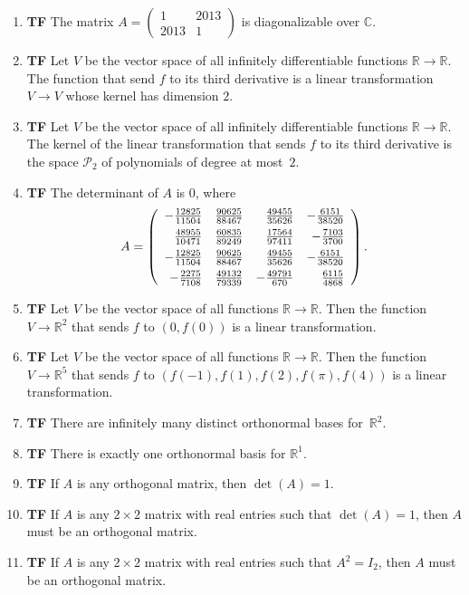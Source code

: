 \documentclass[12pt]{article}
\newcommand{\tf}[1]{\item {\bf {\color{blue}\hspace{1em}T\hspace{1em}F}}\hspace{1em} #1\vspace{1.1ex}}
\newcommand{\R}{\mathbb{R}}
\newcommand{\C}{\mathbb{C}}
\begin{document}
\begin{enumerate}
\tf{The matrix $A=\left(\begin{array}{rr}
1 & 2013 \\
2013 & 1
\end{array}\right)$ is diagonalizable over $\C$.}

\tf{Let $V$ be the vector space of all infinitely differentiable functions $\R\to \R$.
The function that send $f$ to its third derivative is a linear transformation $V\to V$ whose
kernel has dimension $2$.}

\tf{Let $V$ be the vector space of all infinitely differentiable functions $\R\to \R$.
The kernel of the linear transformation that sends $f$ to its third derivative is
the space $\mathcal{P}_{2}$ of polynomials of degree at most~$2$.}

\tf{The determinant of $A$ is $0$, where $$A=\left(\begin{array}{rrrr}
-\frac{12825}{11504} & \frac{90625}{88467} & \frac{49455}{35626} & -\frac{6151}{38520}\vspace{1ex}\\
\frac{48955}{10471} & \frac{60835}{89249} & \frac{17564}{97411} & -\frac{7103}{3700} \vspace{1ex}\\
-\frac{12825}{11504} & \frac{90625}{88467} & \frac{49455}{35626} & -\frac{6151}{38520}\vspace{1ex}\\
-\frac{2275}{7108} & \frac{49132}{79339} & -\frac{49791}{670} & \frac{6115}{4868}
\end{array}\right).$$}

\tf{Let $V$ be the vector space of all functions $\R\to\R$.  Then the function $V\to \R^2$ that sends $f$ to $(0, f(0))$
is a linear transformation.}

\tf{Let $V$ be the vector space of all functions $\R\to\R$.  Then the function $V\to \R^5$ that sends $f$ to $(f(-1),f(1),f(2),f(\pi),f(4))$
is a linear transformation.}

\tf{There are infinitely many distinct orthonormal bases for~$\R^2$.}

\tf{There is exactly one orthonormal basis for $\R^1$.}

\tf{If $A$ is any orthogonal matrix, then $\det(A)=1$.}

\tf{If $A$ is any $2\times 2$ matrix with real entries such that $\det(A)=1$, then $A$ must be an orthogonal matrix.}

\tf{If $A$ is any $2\times 2$ matrix with real entries such that $A^2=I_2$, then $A$ must be an orthogonal matrix.}


\end{enumerate}
\end{document}
